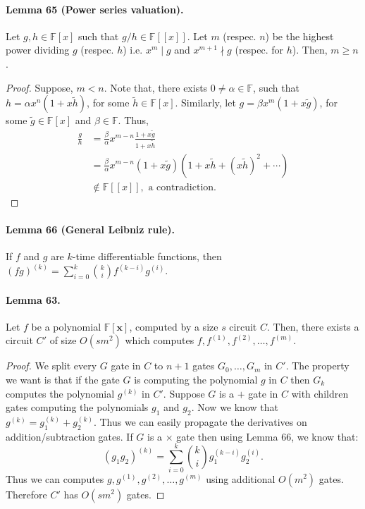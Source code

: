 \documentclass[10pt,a4paper]{article}
\begin{document}
\paragraph{Lemma 65 (Power series valuation).} Let $g,h\in\mathbb F[x]$ such that $g/h\in\mathbb F[[x]]$. Let $m$ (respec. $n$) be the highest power dividing $g$ (respec. $h$) i.e. $x^m\mid g$ and $x^{m+1}\nmid g$ (respec. for $h$). Then, $m\ge n$.
\begin{proof}Suppose, $m<n$. Note that, there exists $0\ne\alpha\in\mathbb F$, such that $h=\alpha x^n(1+x\widetilde h)$, for some $\widetilde h\in\mathbb F[x]$. Similarly, let $g=\beta x^m(1+x\widetilde g)$, for some $\widetilde g\in\mathbb F[x]$ and $\beta\in\mathbb F$. Thus,
\begin{align*}\frac gh&=\frac\beta\alpha x^{m-n}\frac{1+x\widetilde g}{1+x\widetilde h}\\&=\frac\beta\alpha x^{m-n}(1+x\widetilde g)(1+x\widetilde h+(x\widetilde h)^2+\cdots)\\&\notin\mathbb F[[x]],\text{ a contradiction}.\end{align*}\end{proof}
\paragraph{Lemma 66 (General Leibniz rule).} If $f$ and $g$ are $k$-time differentiable functions, then $(fg)^{(k)}=\sum_{i=0}^k\binom ki f^{(k-i)}g^{(i)}$.
\paragraph{Lemma 63.} Let $f$ be a polynomial $\mathbb F[\mathbf x]$, computed by a size $s$ circuit $C$. Then, there exists a circuit $C'$ of size $O(sm^2)$ which computes $f,f^{(1)},f^{(2)},\ldots,f^{(m)}$.
\begin{proof}We split every $G$ gate in $C$ to $n+1$ gates $G_0,\ldots,G_m$ in $C'$. The property we want is that if the gate $G$ is computing the polynomial $g$ in $C$ then $G_k$ computes the polynomial $g^{(k)}$ in $C'$. Suppose $G$ is a $+$ gate in $C$ with children gates computing the polynomials $g_1$ and $g_2$. Now we know that $g^{(k)}=g_1^{(k)}+g_2^{(k)}$. Thus we can easily propagate the derivatives on addition/subtraction gates. If $G$ is a $\times$ gate then using Lemma 66, we know that:
\[(g_1g_2)^{(k)}=\sum_{i=0}^k\binom ki g_1^{(k-i)}g_2^{(i)}.\]
Thus we can computes $g,g^{(1)},g^{(2)},\ldots,g^{(m)}$ using additional $O(m^2)$ gates. Therefore $C'$ has $O(sm^2)$ gates.\end{proof}
\end{document}
